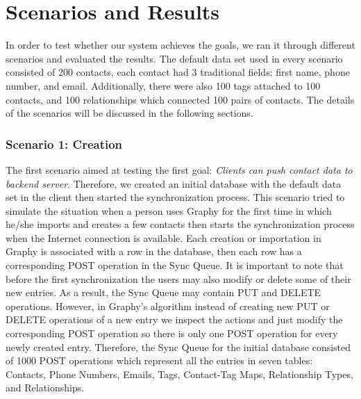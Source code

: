 
\section{Scenarios and Results}
In order to test whether our system achieves the goals, we ran it through different scenarios and evaluated the results. The default data set used in every scenario consisted of 200 contacts, each contact had 3 traditional fields: first name, phone number, and email. Additionally, there were also 100 tags attached to 100 contacts, and 100 relationships which connected 100 pairs of contacts. The details of the scenarios will be discussed in the following sections.

\subsubsection{Scenario 1: Creation}
The first scenario aimed at testing the first goal: \textit{Clients can push contact data to backend server}. Therefore, we created an initial database with the default data set in the client then started the synchronization process. This scenario tried to simulate the situation when a person uses Graphy for the first time in which he/she imports and creates a few contacts then starts the synchronization process when the Internet connection is available. Each creation or importation in Graphy is associated with a row in the database, then each row has a corresponding POST operation in the Sync Queue. It is important to note that before the first synchronization the users may also modify or delete some of their new entries. As a result, the Sync Queue may contain PUT and DELETE operations. However, in Graphy's algorithm instead of creating new PUT or DELETE operations of a new entry we inspect the actions and just modify the corresponding POST operation so there is only one POST operation for every newly created entry. Therefore, the Sync Queue for the initial database consisted of 1000 POST operations which represent all the entries in seven tables: Contacts, Phone Numbers, Emails, Tags, Contact-Tag Maps, Relationship Types, and Relationships. 

